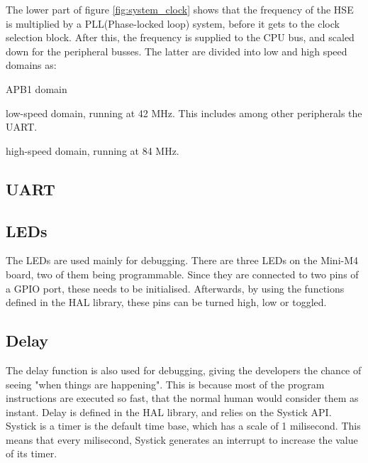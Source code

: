 The lower part of figure \ref{fig:system_clock} shows that the frequency
of the HSE is multiplied by a PLL(Phase-locked loop) system, before it gets
to the clock selection block. After this, the frequency is supplied to
the CPU bus, and scaled down for the peripheral busses. The latter are
divided into low and high speed domains as:

\begin{labeling}{APB1 domain}
	\item[\textbf{APB1 domain}]
		low-speed domain, running at 42 MHz. This includes among other 
		peripherals the UART.
		
	\item[\textbf{APB2 domain}]
		high-speed domain, running at 84 MHz.
	\end{labeling}

\subsection{UART}


\subsection{LEDs}
The LEDs are used mainly for debugging. There are three LEDs on the 
Mini-M4 board, two of them being programmable. Since they are connected
to two pins of a GPIO port, these needs to be initialised. Afterwards, 
by using the functions defined in the HAL library, these pins can be 
turned high, low or toggled.

\subsection{Delay}
The delay function is also used for debugging, giving the developers the 
chance of seeing "when things are happening". This is because most of the
program instructions are executed so fast, that the normal human would
consider them as instant. 
Delay is defined in the HAL library, and relies on the Systick API.
Systick is a timer is the default time base, which has a scale of 1
milisecond. This means that every milisecond, Systick generates an
interrupt to increase the value of its timer.


